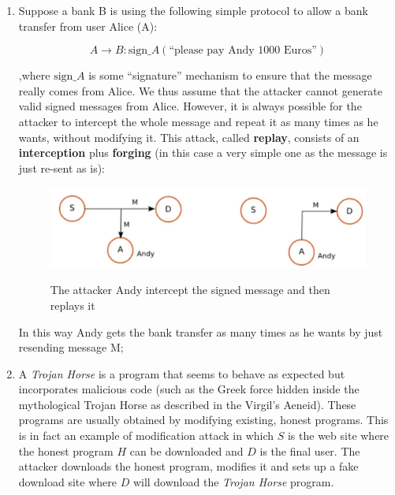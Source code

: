 \begin{enumerate}
    \item Suppose a bank B is using the following simple protocol to allow a bank transfer from user Alice (A):
    
    $$A \xrightarrow{} B: \text{sign}\_A(\text{“please pay Andy 1000 Euros”})$$
    
    ,where $\text{sign}\_A$ is some “signature” mechanism to ensure that the message really comes from Alice. We thus assume that the attacker cannot generate valid signed messages from Alice. However, it is always possible for the attacker to intercept the whole message and repeat it as many times as he wants, without modifying it. This attack, called \textbf{replay}, consists of an \textbf{interception} plus \textbf{forging} (in this case a very simple one as the message is just re-sent as is):

    \begin{figure}[h!]
        \centering
        \includegraphics[scale = 0.7]{img/sec7.jpg}
        \label{sec7}
        \caption{The attacker Andy intercept the signed message and then replays it}
    \end{figure}

    In this way Andy gets the bank transfer as many times as he wants by just resending message M;

    \item A \textit{Trojan Horse} is a program that seems to behave as expected but incorporates malicious code (such as the Greek force hidden inside the mythological Trojan Horse as described in the Virgil’s Aeneid). These programs are usually obtained by modifying existing, honest programs. This is in fact an example of modification attack in which $S$ is the web site where the honest program $H$ can be downloaded and $D$ is the final user. The attacker downloads the honest program, modifies it and sets up a fake download site where $D$ will download the \textit{Trojan Horse} program.


\end{enumerate}
